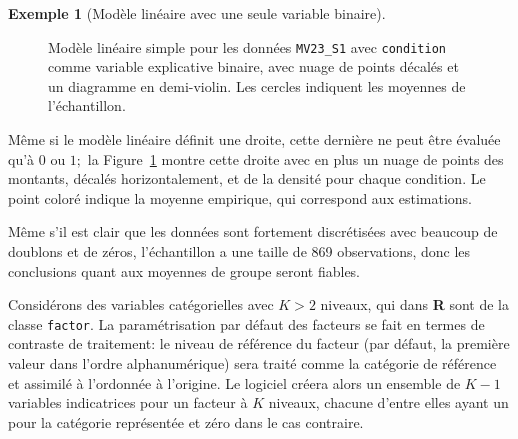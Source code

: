 \documentclass[
  11pt,
  letterpaper,
]{scrbook}
\theoremstyle{plain}
\theoremstyle{plain}
\theoremstyle{definition}
\newtheorem{example}{Exemple}[chapter]
\theoremstyle{definition}
\theoremstyle{remark}
\begin{document}
\begin{example}[Modèle linéaire avec une seule variable
binaire]
\begin{figure}[ht!]
{}

\caption{\label{fig-donation-moon}Modèle linéaire simple pour les
données \texttt{MV23\_S1} avec \texttt{condition} comme variable
explicative binaire, avec nuage de points décalés et un diagramme en
demi-violin. Les cercles indiquent les moyennes de l'échantillon.}

\end{figure}%

Même si le modèle linéaire définit une droite, cette dernière ne peut
être évaluée qu'à \(0\) ou \(1;\) la Figure~\ref{fig-donation-moon}
montre cette droite avec en plus un nuage de points des montants,
décalés horizontalement, et de la densité pour chaque condition. Le
point coloré indique la moyenne empirique, qui correspond aux
estimations.

Même s'il est clair que les données sont fortement discrétisées avec
beaucoup de doublons et de zéros, l'échantillon a une taille de 869
observations, donc les conclusions quant aux moyennes de groupe seront
fiables.

\end{example}

Considérons des variables catégorielles avec \(K > 2\) niveaux, qui dans
\textbf{R} sont de la classe \texttt{factor}. La paramétrisation par
défaut des facteurs se fait en termes de contraste de traitement: le
niveau de référence du facteur (par défaut, la première valeur dans
l'ordre alphanumérique) sera traité comme la catégorie de référence et
assimilé à l'ordonnée à l'origine. Le logiciel créera alors un ensemble
de \(K-1\) variables indicatrices pour un facteur à \(K\) niveaux,
chacune d'entre elles ayant un pour la catégorie représentée et zéro
dans le cas contraire.
\end{document}
